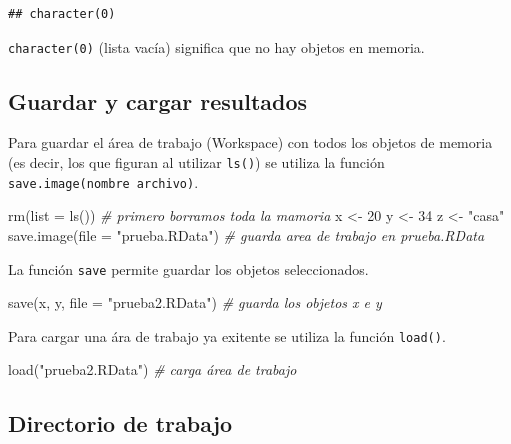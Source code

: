 \documentclass[
]{book}
\newenvironment{Shaded}{\begin{snugshade}}{\end{snugshade}}
\newcommand{\AttributeTok}[1]{\textcolor[rgb]{0.77,0.63,0.00}{#1}}
\newcommand{\CommentTok}[1]{\textcolor[rgb]{0.56,0.35,0.01}{\textit{#1}}}
\newcommand{\DecValTok}[1]{\textcolor[rgb]{0.00,0.00,0.81}{#1}}
\newcommand{\FunctionTok}[1]{\textcolor[rgb]{0.00,0.00,0.00}{#1}}
\newcommand{\NormalTok}[1]{#1}
\newcommand{\OtherTok}[1]{\textcolor[rgb]{0.56,0.35,0.01}{#1}}
\newcommand{\StringTok}[1]{\textcolor[rgb]{0.31,0.60,0.02}{#1}}
\theoremstyle{break}
\begin{document}
\begin{verbatim}
## character(0)
\end{verbatim}

\texttt{character(0)} (lista vacía) significa que no hay objetos en memoria.

\hypertarget{guardar-y-cargar-resultados}{%
\subsection{Guardar y cargar resultados}\label{guardar-y-cargar-resultados}}

Para guardar
el área de trabajo (Workspace) con todos los objetos de memoria (es
decir, los que figuran al utilizar \texttt{ls()}) se utiliza la función
\texttt{save.image(nombre\ archivo)}.

\begin{Shaded}
\begin{Highlighting}[]
\FunctionTok{rm}\NormalTok{(}\AttributeTok{list =} \FunctionTok{ls}\NormalTok{()) }\CommentTok{\# primero borramos toda la mamoria}
\NormalTok{x }\OtherTok{\textless{}{-}} \DecValTok{20}
\NormalTok{y }\OtherTok{\textless{}{-}} \DecValTok{34}
\NormalTok{z }\OtherTok{\textless{}{-}} \StringTok{"casa"}
\FunctionTok{save.image}\NormalTok{(}\AttributeTok{file =} \StringTok{"prueba.RData"}\NormalTok{) }\CommentTok{\# guarda area de trabajo en prueba.RData}
\end{Highlighting}
\end{Shaded}

La función \texttt{save} permite guardar los objetos seleccionados.

\begin{Shaded}
\begin{Highlighting}[]
\FunctionTok{save}\NormalTok{(x, y, }\AttributeTok{file =} \StringTok{"prueba2.RData"}\NormalTok{) }\CommentTok{\# guarda los objetos x e y}
\end{Highlighting}
\end{Shaded}

Para cargar una ára de trabajo ya exitente se utiliza la función
\texttt{load()}.

\begin{Shaded}
\begin{Highlighting}[]
\FunctionTok{load}\NormalTok{(}\StringTok{"prueba2.RData"}\NormalTok{) }\CommentTok{\# carga área de trabajo}
\end{Highlighting}
\end{Shaded}

\hypertarget{directorio-de-trabajo}{%
\subsection{Directorio de trabajo}\label{directorio-de-trabajo}}
\end{document}
